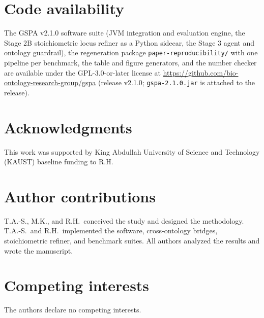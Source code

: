 \documentclass[10pt,twocolumn]{article}
\begin{document}
\section*{Code availability}

The GSPA v2.1.0 software suite (JVM integration and evaluation engine, the Stage 2B stoichiometric locus refiner as a Python sidecar, the Stage 3 agent and ontology guardrail), the regeneration package \texttt{paper-reproducibility/} with one pipeline per benchmark, the table and figure generators, and the number checker are available under the GPL-3.0-or-later license at \url{https://github.com/bio-ontology-research-group/gspa} (release v2.1.0; \texttt{gspa-2.1.0.jar} is attached to the release).

\section*{Acknowledgments}

This work was supported by King Abdullah University of Science and Technology (KAUST) baseline funding to R.H.

\section*{Author contributions}

T.A.-S., M.K., and R.H.\ conceived the study and designed the methodology. T.A.-S.\ and R.H.\ implemented the software, cross-ontology bridges, stoichiometric refiner, and benchmark suites. All authors analyzed the results and wrote the manuscript.

\section*{Competing interests}

The authors declare no competing interests.



\end{document}
